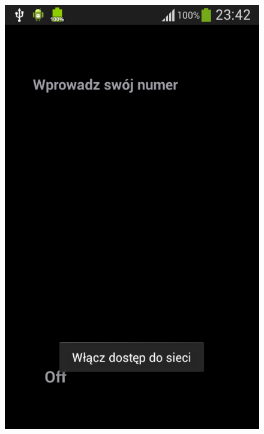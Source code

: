 \documentclass[eng,printmode,oneside]{mgr}
\begin{document}
\begin{figure}
{\includegraphics[height=0.33\textheight]{andWifi.png}
}
\end{figure}
\end{document}
